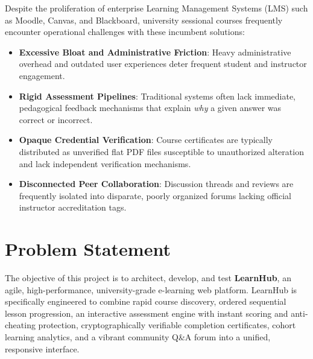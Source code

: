 \documentclass[12pt,a4paper]{report}
\begin{document}
Despite the proliferation of enterprise Learning Management Systems (LMS) such as Moodle, Canvas, and Blackboard, university sessional courses frequently encounter operational challenges with these incumbent solutions:
\begin{itemize}[itemsep=4pt]
    \item \textbf{Excessive Bloat and Administrative Friction}: Heavy administrative overhead and outdated user experiences deter frequent student and instructor engagement.
    \item \textbf{Rigid Assessment Pipelines}: Traditional systems often lack immediate, pedagogical feedback mechanisms that explain \textit{why} a given answer was correct or incorrect.
    \item \textbf{Opaque Credential Verification}: Course certificates are typically distributed as unverified flat PDF files susceptible to unauthorized alteration and lack independent verification mechanisms.
    \item \textbf{Disconnected Peer Collaboration}: Discussion threads and reviews are frequently isolated into disparate, poorly organized forums lacking official instructor accreditation tags.
\end{itemize}

\section{Problem Statement}
The objective of this project is to architect, develop, and test \textbf{LearnHub}, an agile, high-performance, university-grade e-learning web platform. LearnHub is specifically engineered to combine rapid course discovery, ordered sequential lesson progression, an interactive assessment engine with instant scoring and anti-cheating protection, cryptographically verifiable completion certificates, cohort learning analytics, and a vibrant community Q\&A forum into a unified, responsive interface.
\end{document}
